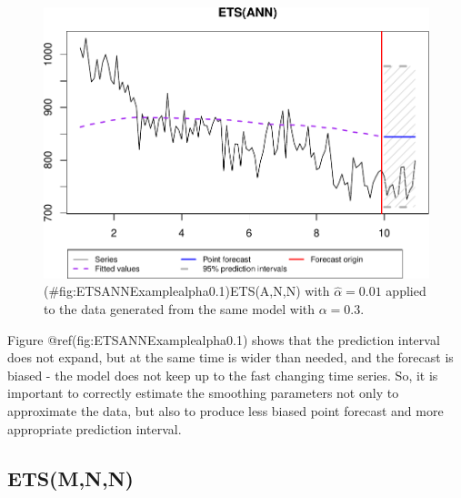 \documentclass[
]{book}
\theoremstyle{definition}
\theoremstyle{definition}
\theoremstyle{definition}
\theoremstyle{definition}
\theoremstyle{remark}
\begin{document}
\begin{figure}
\centering
\includegraphics{adam_files/figure-latex/ETSANNExamplealpha0.1-1.pdf}
\caption{(\#fig:ETSANNExamplealpha0.1)ETS(A,N,N) with \(\hat{\alpha}=0.01\) applied to the data generated from the same model with \(\alpha=0.3\).}
\end{figure}

Figure @ref(fig:ETSANNExamplealpha0.1) shows that the prediction interval does not expand, but at the same time is wider than needed, and the forecast is biased - the model does not keep up to the fast changing time series. So, it is important to correctly estimate the smoothing parameters not only to approximate the data, but also to produce less biased point forecast and more appropriate prediction interval.

\hypertarget{etsmnn}{%
\subsection{ETS(M,N,N)}\label{etsmnn}}
\end{document}
